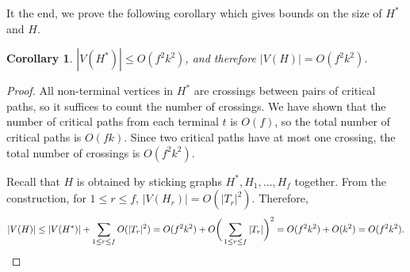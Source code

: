 \documentclass[11pt]{article}
\newtheorem{observation}[theorem]{Observation}
\newtheorem{corollary}[theorem]{Corollary}
\begin{document}
    

        

\fi


It the end, we prove the following corollary which gives bounds on the size of $H^*$ and $H$.

\begin{corollary}
\label{clm: size}
$|V(H^*)|\le O(f^2k^2)$, and therefore $|V(H)|=O(f^2k^2)$.
\end{corollary}
\begin{proof}
All non-terminal vertices in $H^*$ are crossings between pairs of critical paths, so it suffices to count the number of crossings.
We have shown that the number of critical paths from each terminal $t$ is $O(f)$, so the total number of critical paths is $O(fk)$. Since two critical paths have at most one crossing, the total number of crossings is $O(f^2k^2)$. 

Recall that $H$ is obtained by sticking graphs $H^*,H_1,\ldots,H_f$ together.
From the construction, for $1\le r\le f$, $|V(H_r)|=O(|T_r|^2)$. Therefore,
\[|V(H)|\le |V(H^*)|+\sum_{1\le r\le f}O(|T_r|^2)=O(f^2k^2)+ O\bigg(\sum_{1\le r\le f}|T_r|\bigg)^2=O(f^2k^2)+O(k^2)=O(f^2k^2).\qedhere\]
\end{proof}
\end{document}

